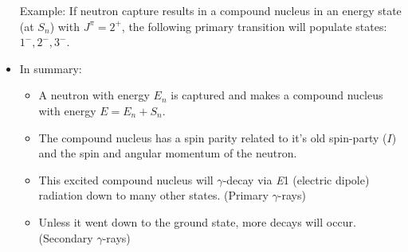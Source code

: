 \documentclass[letter]{article}
\begin{document}
\begin{itemize}
  \vspace{10pt}
  Example: If neutron capture results in a compound nucleus in an
  energy state (at $S_n$) with $J^\pi = 2^+$, the following primary
  transition will populate states: $1^-, 2^-, 3^-$.
\item In summary:
  \begin{itemize}
  \item A neutron with energy $E_n$ is captured and makes a compound
    nucleus with energy $E=E_n + S_n$.
  \item The compound nucleus has a spin parity related to it's old
    spin-party ($I$) and the spin and angular momentum of the neutron.
  \item This excited compound nucleus will $\gamma$-decay via
    \textit{E}1 (electric dipole) radiation down to many other
    states. (Primary $\gamma$-rays)
  \item Unless it went down to the ground state, more decays will
    occur. (Secondary $\gamma$-rays)
  \end{itemize}
\end{itemize}
\end{document}
